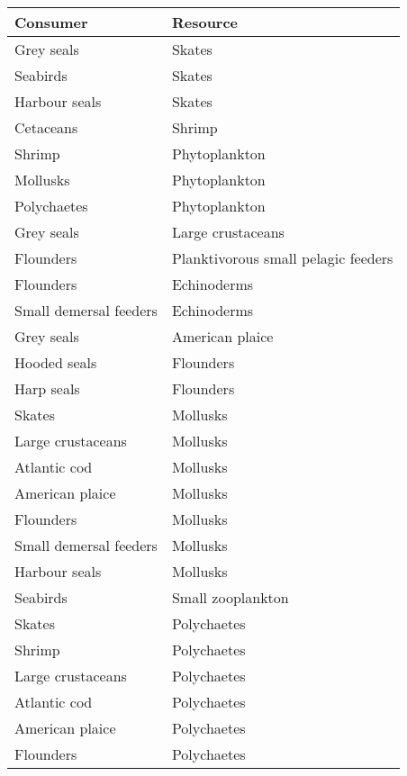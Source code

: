\documentclass[letterpaper]{article}
\begin{document}
\begin{table}[h!]
  \centering
  \begin{tabular}{|l|l|}
    \hline
      Consumer               & Resource \\
    \hline  \hline
    Grey seals             & Skates \\
    Seabirds               & Skates \\
    Harbour seals          & Skates \\
    Cetaceans              & Shrimp \\
    Shrimp                 & Phytoplankton  \\
    Mollusks               & Phytoplankton  \\
    Polychaetes            & Phytoplankton  \\
    Grey seals             & Large crustaceans  \\
    Flounders              & Planktivorous small pelagic feeders    \\
    Flounders              & Echinoderms    \\
    Small demersal feeders & Echinoderms    \\
    Grey seals             & American plaice    \\
    Hooded seals           & Flounders  \\
    Harp seals             & Flounders  \\
    Skates                 & Mollusks   \\
    Large crustaceans      & Mollusks   \\
    Atlantic cod           & Mollusks   \\
    American plaice        & Mollusks   \\
    Flounders              & Mollusks   \\
    Small demersal feeders & Mollusks   \\
    Harbour seals          & Mollusks   \\
    Seabirds               & Small zooplankton  \\
    Skates                 & Polychaetes    \\
    Shrimp                 & Polychaetes    \\
    Large crustaceans      & Polychaetes    \\
    Atlantic cod           & Polychaetes    \\
    American plaice        & Polychaetes    \\
    Flounders              & Polychaetes    \\

\end{tabular}
\end{table}
\end{document}
